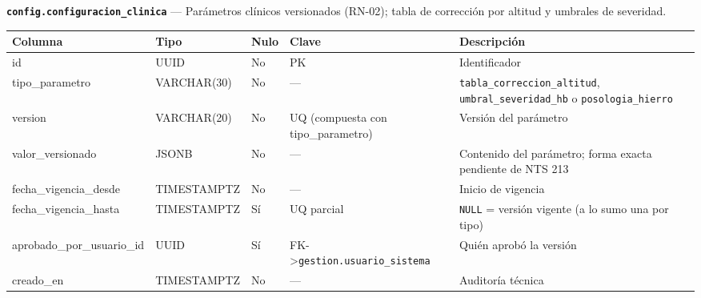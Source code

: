 \documentclass[11pt,a4paper]{article}
\begin{document}
\textbf{\texttt{config.configuracion\_clinica}} --- Parámetros clínicos versionados (RN-02); tabla de corrección por altitud y umbrales de severidad.

{\small
\begin{longtable}[]{@{}
  >{\raggedright\arraybackslash}p{}
  >{\raggedright\arraybackslash}p{}
  >{\raggedright\arraybackslash}p{}
  >{\raggedright\arraybackslash}p{}
  >{\raggedright\arraybackslash}p{}@{}}
\toprule\noalign{}
\begin{minipage}[b]{\linewidth}\raggedright
Columna
\end{minipage} & \begin{minipage}[b]{\linewidth}\raggedright
Tipo
\end{minipage} & \begin{minipage}[b]{\linewidth}\raggedright
Nulo
\end{minipage} & \begin{minipage}[b]{\linewidth}\raggedright
Clave
\end{minipage} & \begin{minipage}[b]{\linewidth}\raggedright
Descripción
\end{minipage} \\
\midrule\noalign{}
\endhead
\bottomrule\noalign{}
\endlastfoot
id & UUID & No & PK & Identificador \\
tipo\_parametro & VARCHAR(30) & No & --- & \texttt{tabla\_correccion\_altitud}, \texttt{umbral\_severidad\_hb} o \texttt{posologia\_hierro} \\
version & VARCHAR(20) & No & UQ (compuesta con tipo\_parametro) & Versión del parámetro \\
valor\_versionado & JSONB & No & --- & Contenido del parámetro; forma exacta pendiente de NTS 213 \\
fecha\_vigencia\_desde & TIMESTAMPTZ & No & --- & Inicio de vigencia \\
fecha\_vigencia\_hasta & TIMESTAMPTZ & Sí & UQ parcial & \texttt{NULL} = versión vigente (a lo sumo una por tipo) \\
aprobado\_por\_usuario\_id & UUID & Sí & FK-\textgreater{}\texttt{gestion.usuario\_sistema} & Quién aprobó la versión \\
creado\_en & TIMESTAMPTZ & No & --- & Auditoría técnica \\
\end{longtable}
}
\end{document}
